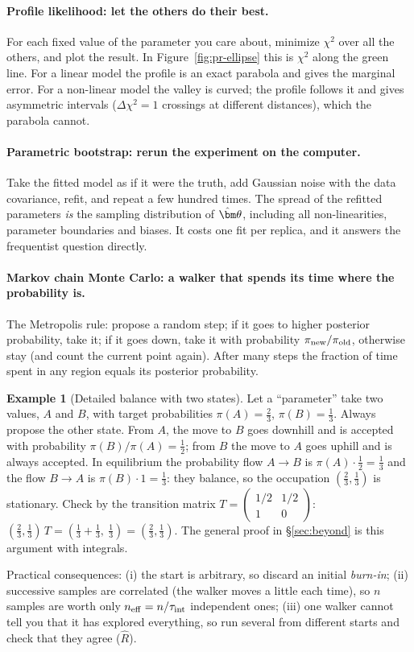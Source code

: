 \documentclass[11pt,a4paper]{article}
\numberwithin{equation}{section}
\theoremstyle{definition}
\newtheorem{example}[definition]{Example}
\theoremstyle{plain}
\theoremstyle{remark}
\numberwithin{algorithm}{section}
\newcommand{\vth}{\bm\theta}
\begin{document}
\paragraph{Profile likelihood: let the others do their best.} For each fixed value of the parameter you care about, minimize $\chi^2$ over all the others, and plot the result. In Figure~\ref{fig:pr-ellipse} this is $\chi^2$ along the green line. For a linear model the profile is an exact parabola and gives the marginal error. For a non-linear model the valley is curved; the profile follows it and gives asymmetric intervals ($\Delta\chi^2=1$ crossings at different distances), which the parabola cannot.

\paragraph{Parametric bootstrap: rerun the experiment on the computer.} Take the fitted model as if it were the truth, add Gaussian noise with the data covariance, refit, and repeat a few hundred times. The spread of the refitted parameters \emph{is} the sampling distribution of $\hat\vth$, including all non-linearities, parameter boundaries and biases. It costs one fit per replica, and it answers the frequentist question directly.

\paragraph{Markov chain Monte Carlo: a walker that spends its time where the probability is.} The Metropolis rule: propose a random step; if it goes to higher posterior probability, take it; if it goes down, take it with probability $\pi_{\rm new}/\pi_{\rm old}$, otherwise stay (and count the current point again). After many steps the fraction of time spent in any region equals its posterior probability.

\begin{example}[Detailed balance with two states]
Let a ``parameter'' take two values, $A$ and $B$, with target probabilities $\pi(A)=\frac23$, $\pi(B)=\frac13$. Always propose the other state. From $A$, the move to $B$ goes downhill and is accepted with probability $\pi(B)/\pi(A)=\frac12$; from $B$ the move to $A$ goes uphill and is always accepted. In equilibrium the probability flow $A\to B$ is $\pi(A)\cdot\frac12=\frac13$ and the flow $B\to A$ is $\pi(B)\cdot1=\frac13$: they balance, so the occupation $(\frac23,\frac13)$ is stationary. Check by the transition matrix $T=\begin{pmatrix}1/2&1/2\\1&0\end{pmatrix}$: $(\frac23,\frac13)\,T=(\frac13+\frac13,\ \frac13)=(\frac23,\frac13)$. The general proof in \S\ref{sec:beyond} is this argument with integrals.
\end{example}
Practical consequences: (i) the start is arbitrary, so discard an initial \emph{burn-in}; (ii) successive samples are correlated (the walker moves a little each time), so $n$ samples are worth only $n_{\rm eff}=n/\tau_{\rm int}$ independent ones; (iii) one walker cannot tell you that it has explored everything, so run several from different starts and check that they agree ($\hat R$).
\end{document}

